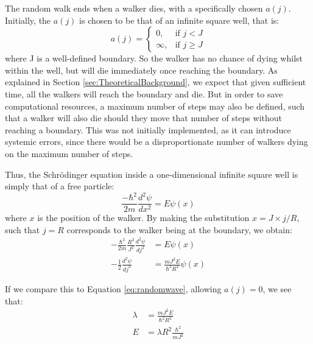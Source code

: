\documentclass[journal]{IEEEtran}
\begin{document}
The random walk ends when a walker dies, with a
specifically chosen $a(j)$. Initially, the $a(j)$ is chosen to be that of an
infinite square well, that is:
\begin{equation}
  \label{eq:squarewell}
    a(j) =
    \begin{cases}
      0,& \text{if } j < J\\
      \infty,& \text{if } j \geq J
    \end{cases}
    \nonumber
\end{equation}
where J is a well-defined boundary. So the walker has no chance of dying whilst
within the well, but will die immediately once reaching the boundary. As
explained in Section \ref{sec:TheoreticalBackground}, we expect that given
sufficient time, all the walkers will reach the boundary and die. But in order
to save computational resources, a maximum number of steps may also be defined,
such that a walker will also die should they move that number of steps without
reaching a boundary. This was not initially implemented, as it can introduce
systemic errors, since there would be a disproportionate number of walkers dying
on the maximum number of steps.

Thus, the Schr\"{o}dinger equation inside a one-dimensional infinite square well
is simply that of a free particle:
\begin{equation}
  \frac{-\hbar^2}{2m}\frac{d^2 \psi}{dx^2} = E\psi(x)
  \nonumber
\end{equation}
where $x$ is the position of the walker. By making the substitution $x = J
\times j/R$, such that $j=R$ corresponds to the walker being at the boundary, we
obtain:
\begin{equation}
  \begin{split}
    -\frac{\hbar^2}{2m}\frac{R^2}{J^2}\frac{d^2\psi}{dj^2} &= E\psi(x)\\
    -\frac{1}{2}\frac{d^2\psi}{dj^2} &= \frac{mJ^2E}{\hbar^2R^2}\psi(x)
  \end{split}
  \nonumber
\end{equation}

If we compare this to Equation \ref{eq:randomwave}, allowing $a(j) = 0$, we see
that:
\begin{equation}
  \begin{split}
    \lambda &= \frac{mJ^2E}{\hbar^2R^2} \\
    E &= \lambda R^2 \frac{\hbar^2}{mJ^2}
  \end{split}
  \nonumber
\end{equation}
\end{document}
